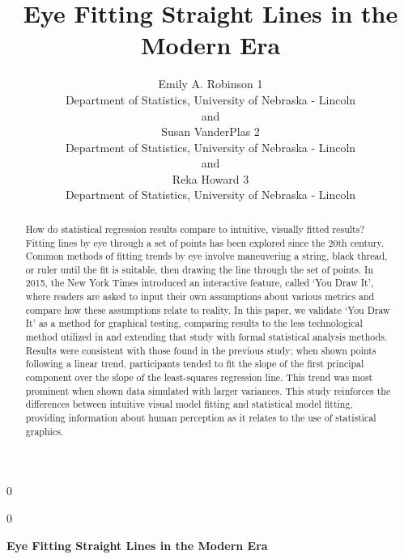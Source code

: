 \documentclass[12pt]{article}
\newcommand{\blind}{0}
\begin{document}
\def\spacingset#1{\renewcommand{\baselinestretch}%
{#1}\small\normalsize} \spacingset{1}



\blind
{
  \title{\bf Eye Fitting Straight Lines in the Modern Era}

  \author{
        Emily A. Robinson 1 \\
    Department of Statistics, University of Nebraska - Lincoln\\
     and \\     Susan VanderPlas 2 \\
    Department of Statistics, University of Nebraska - Lincoln\\
     and \\     Reka Howard 3 \\
    Department of Statistics, University of Nebraska - Lincoln\\
      }
  \maketitle
} \fi

\blind
{
  \bigskip
  \bigskip
  \bigskip
  \begin{center}
    {\LARGE\bf Eye Fitting Straight Lines in the Modern Era}
  \end{center}
  \medskip
} \fi

\bigskip
\begin{abstract}
How do statistical regression results compare to intuitive, visually
fitted results? Fitting lines by eye through a set of points has been
explored since the 20th century. Common methods of fitting trends by eye
involve maneuvering a string, black thread, or ruler until the fit is
suitable, then drawing the line through the set of points. In 2015, the
New York Times introduced an interactive feature, called `You Draw It',
where readers are asked to input their own assumptions about various
metrics and compare how these assumptions relate to reality. In this
paper, we validate `You Draw It' as a method for graphical testing,
comparing results to the less technological method utilized in
\citet{mosteller1981eye} and extending that study with formal
statistical analysis methods. Results were consistent with those found
in the previous study; when shown points following a linear trend,
participants tended to fit the slope of the first principal component
over the slope of the least-squares regression line. This trend was most
prominent when shown data simulated with larger variances. This study
reinforces the differences between intuitive visual model fitting and
statistical model fitting, providing information about human perception
as it relates to the use of statistical graphics.
\end{abstract}
\end{document}
